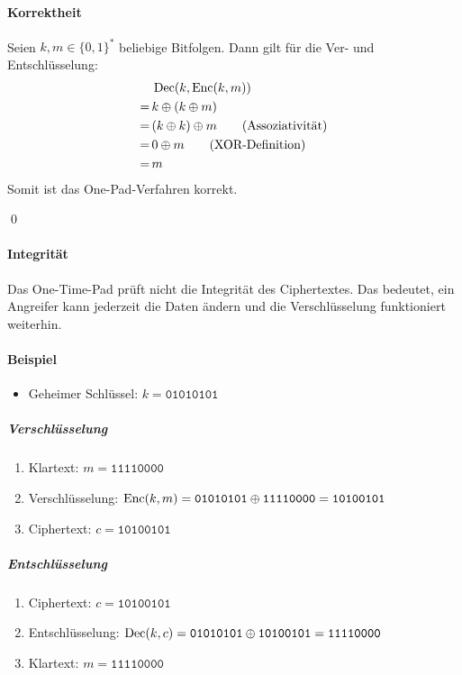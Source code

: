 			\paragraph{Korrektheit}
				Seien \( k, m \in \{ 0, 1 \} ^ * \) beliebige Bitfolgen. Dann gilt für die Ver- und Entschlüsselung:
				\begin{align*}
					  & \, \operatorname{Dec}(k, \operatorname{Enc}(k, m))                        \\
					= & \, k \oplus (k \oplus m)                      \\
					= & \, (k \oplus k) \oplus m \tag{Assoziativität} \\
					= & \, 0 \oplus m \tag{XOR-Definition}            \\
					= & \, m
				\end{align*}
				Somit ist das One-Pad-Verfahren korrekt.

				\qed

			\paragraph{Integrität}
				Das One-Time-Pad prüft nicht die Integrität des Ciphertextes. Das bedeutet, ein Angreifer kann jederzeit die Daten ändern und die Verschlüsselung funktioniert weiterhin.

			\paragraph{Beispiel}
				\begin{itemize}
					\item Geheimer Schlüssel: \( k = \texttt{01010101} \)
				\end{itemize}

				\subparagraph{Verschlüsselung}
					\begin{enumerate}
						\item[] Klartext: \( m = \texttt{11110000} \)
						\item Verschlüsselung: \( \operatorname{Enc}(k, m) = \texttt{01010101} \oplus \texttt{11110000} = \texttt{10100101} \)
						\item[] Ciphertext: \( c = \texttt{10100101} \)
					\end{enumerate}

				\subparagraph{Entschlüsselung}
					\begin{enumerate}
						\item[] Ciphertext: \( c = \texttt{10100101} \)
						\item Entschlüsselung: \( \operatorname{Dec}(k, c) = \texttt{01010101} \oplus \texttt{10100101} = \texttt{11110000} \)
						\item[] Klartext: \( m = \texttt{11110000} \)
					\end{enumerate}

